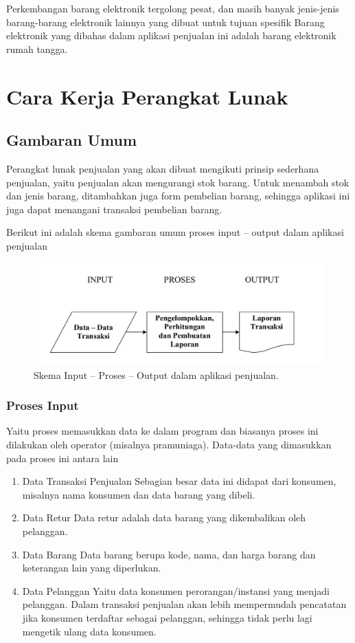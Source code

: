 \documentclass{article}
\begin{document}
Perkembangan barang elektronik tergolong pesat, dan masih banyak jenis-jenis barang-barang elektronik lainnya yang dibuat untuk tujuan spesifik Barang elektronik yang dibahas dalam aplikasi penjualan ini adalah barang elektronik rumah tangga.

\section{Cara Kerja Perangkat Lunak}
\subsection{Gambaran Umum}
Perangkat lunak penjualan yang akan dibuat mengikuti prinsip sederhana penjualan, yaitu penjualan akan mengurangi stok barang. Untuk menambah stok dan jenis barang, ditambahkan juga form pembelian barang, sehingga aplikasi ini juga dapat menangani transaksi pembelian barang.

Berikut ini adalah skema gambaran umum proses input – output dalam aplikasi penjualan

\begin{figure}[htp]
    \centering
    \includegraphics[width=12cm]{gambar_3_1.JPG}
    \caption{ Skema Input – Proses – Output dalam aplikasi penjualan.}
    \label{fig:my_label}
\end{figure}

\subsubsection{Proses Input}
Yaitu proses memasukkan data ke dalam program dan biasanya proses ini dilakukan oleh operator (misalnya pramuniaga). Data-data yang dimasukkan pada proses ini antara lain
\begin{enumerate}
    \item Data Transaksi Penjualan \newline
    Sebagian besar data ini didapat dari konsumen, misalnya nama konsumen dan data barang yang dibeli.
    \item Data Retur \newline
    Data retur adalah data barang yang dikembalikan oleh pelanggan.
    \item Data Barang \newline
    Data barang berupa kode, nama, dan harga barang dan keterangan lain yang diperlukan.
    \item Data Pelanggan \newline
    Yaitu data konsumen perorangan/instansi yang menjadi pelanggan. Dalam transaksi penjualan akan lebih mempermudah pencatatan jika konsumen terdaftar sebagai pelanggan, sehingga tidak perlu lagi mengetik ulang data konsumen.
\end{enumerate}
\end{document}
